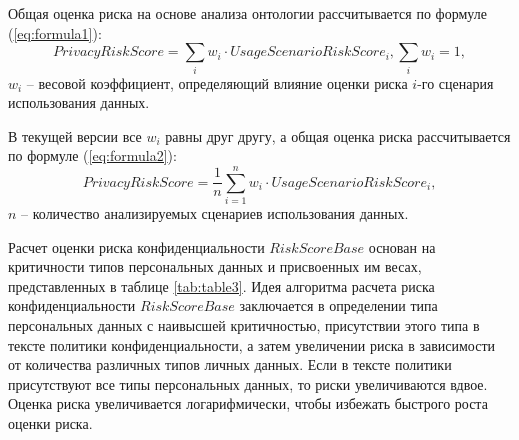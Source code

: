 \documentclass[../main]{subfiles}
\begin{document}
Общая оценка риска на основе анализа онтологии рассчитывается по формуле (\ref{eq:formula1}): 
\begin{equation}
    \label{eq:formula1}
    PrivacyRiskScore = \sum_i{w_i} \cdot UsageScenarioRiskScore_i, \sum_{i}{w_i} = 1,
\end{equation}
$w_i$ -- весовой коэффициент, определяющий влияние оценки риска $i$-го сценария использования данных. 

В текущей версии все $w_i$ равны друг другу, а общая оценка риска рассчитывается по формуле (\ref{eq:formula2}): 
\begin{equation}
    \label{eq:formula2}
    PrivacyRiskScore = \frac{1}{n}\sum^n_{i=1}{w_i} \cdot UsageScenarioRiskScore_i,
\end{equation}
$n$ -- количество анализируемых сценариев использования данных.

Расчет оценки риска конфиденциальности $RiskScoreBase$ основан на критичности типов персональных данных и присвоенных им весах, представленных в таблице \ref{tab:table3}. Идея алгоритма расчета риска конфиденциальности $RiskScoreBase$ заключается в определении типа персональных данных с наивысшей критичностью, присутствии этого типа в тексте политики конфиденциальности, а затем увеличении риска в зависимости от количества различных типов личных данных. Если в тексте политики присутствуют все типы персональных данных, то риски увеличиваются вдвое. Оценка риска увеличивается логарифмически, чтобы избежать быстрого роста оценки риска. 
\end{document}
